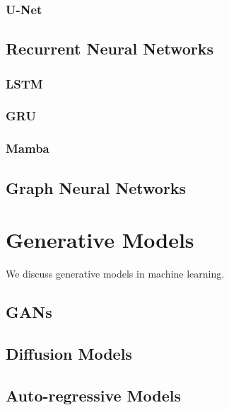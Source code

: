 \documentclass[a4paper]{article}
\begin{document}
\subsubsection{U-Net}

\subsection{Recurrent Neural Networks}
\subsubsection{LSTM}
\subsubsection{GRU}
\subsubsection{Mamba}

\subsection{Graph Neural Networks}


\section{Generative Models}
We discuss generative models in machine learning.

\subsection{GANs}

\subsection{Diffusion Models}

\subsection{Auto-regressive Models}
\end{document}
